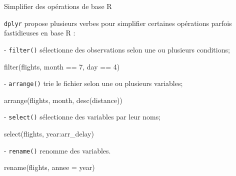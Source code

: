 \documentclass[12pt,ignorenonframetext,]{beamer}
\newenvironment{Shaded}{}{}
\newcommand{\KeywordTok}[1]{\textcolor[rgb]{0.00,0.00,1.00}{#1}}
\newcommand{\DataTypeTok}[1]{#1}
\newcommand{\DecValTok}[1]{#1}
\newcommand{\StringTok}[1]{\textcolor[rgb]{0.00,0.50,0.50}{#1}}
\newcommand{\OperatorTok}[1]{#1}
\newcommand{\NormalTok}[1]{#1}
\renewenvironment{Shaded}{\begin{snugshade}}{\end{snugshade}}
\begin{document}
\begin{frame}[fragile]{Simplifier des opérations de base R}

\texttt{dplyr} propose plusieurs verbes pour simplifier certaines
opérations parfois fastidieuses en base R :

\pause \vspace{-1mm} - \texttt{filter()} sélectionne des observations
selon une ou plusieurs conditions;

\vspace{-3mm}

\begin{Shaded}
\begin{Highlighting}[]
\KeywordTok{filter}\NormalTok{(flights, month }\OperatorTok{==}\StringTok{ }\DecValTok{7}\NormalTok{, day }\OperatorTok{==}\StringTok{ }\DecValTok{4}\NormalTok{)}
\end{Highlighting}
\end{Shaded}

\pause \vspace{-3mm} - \texttt{arrange()} trie le fichier selon une ou
plusieurs variables;

\vspace{-3mm}

\begin{Shaded}
\begin{Highlighting}[]
\KeywordTok{arrange}\NormalTok{(flights, month, }\KeywordTok{desc}\NormalTok{(distance))}
\end{Highlighting}
\end{Shaded}

\pause \vspace{-3mm} - \texttt{select()} sélectionne des variables par
leur noms;

\vspace{-3mm}

\begin{Shaded}
\begin{Highlighting}[]
\KeywordTok{select}\NormalTok{(flights, year}\OperatorTok{:}\NormalTok{arr_delay)}
\end{Highlighting}
\end{Shaded}

\pause \vspace{-3mm} - \texttt{rename()} renomme des variables.

\vspace{-3mm}

\begin{Shaded}
\begin{Highlighting}[]
\KeywordTok{rename}\NormalTok{(flights, }\DataTypeTok{annee =}\NormalTok{ year)}
\end{Highlighting}
\end{Shaded}

\end{frame}
\end{document}
